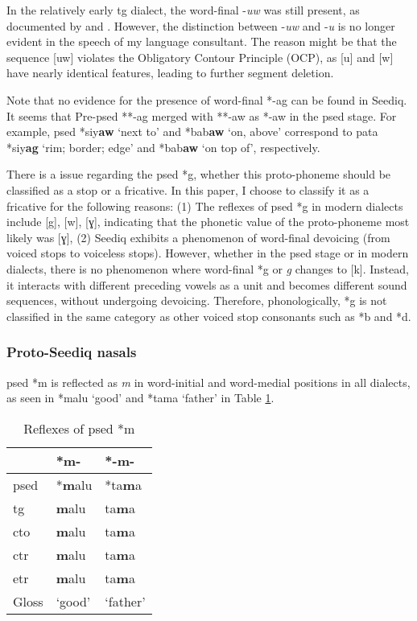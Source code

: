In the relatively early \acl{tg} dialect, the word-final -\textit{uw} was still present, as documented by \textcite{yang1976sedpho} and \textcite{li1981paic}. However, the distinction between -\textit{uw} and -\textit{u} is no longer evident in the speech of my language consultant. The reason might be that the sequence [uw] violates the Obligatory Contour Principle (OCP), as [u] and [w] have nearly identical features, leading to further segment deletion.

Note that no evidence for the presence of word-final *-ag can be found in Seediq. It seems that Pre-\acl{psed} **-ag merged with **-aw as *-aw in the \acl{psed} stage. For example, \acl{psed} *siy\textbf{aw} `next to' and *bab\textbf{aw} `on, above' correspond to \acl{pata} *siy\textbf{ag} `rim; border; edge' and *bab\textbf{aw} `on top of', respectively.

There is a issue regarding the \acl{psed} *g, whether this proto-phoneme should be classified as a stop or a fricative. In this paper, I choose to classify it as a fricative for the following reasons: (1) The reflexes of \acl{psed} *g in modern dialects include [g], [w], [ɣ], indicating that the phonetic value of the proto-phoneme most likely was [ɣ], (2) Seediq exhibits a phenomenon of word-final devoicing (from voiced stops to voiceless stops). However, whether in the \acl{psed} stage or in modern dialects, there is no phenomenon where word-final *g or \textit{g} changes to [k]. Instead, it interacts with different preceding vowels as a unit and becomes different sound sequences, without undergoing devoicing. Therefore, phonologically, *g is not classified in the same category as other voiced stop consonants such as *b and *d.

\subsubsection{Proto-Seediq nasals}

\acl{psed} *m is reflected as \textit{m} in word-initial and word-medial positions in all dialects, as seen in *malu `good' and *tama `father' in Table \ref{tab:psed_m}.

\begin{table}[!htbp]
\centering
\caption{Reflexes of \acl{psed} *m}
\label{tab:psed_m}
\begin{tabular}{lll}
\hline
           & *m-    & *-m-     \\ \hline
\acs{psed} & *\textbf{m}alu  & *ta\textbf{m}a    \\ \hdashline
\acs{tg}   & \textbf{m}alu   & ta\textbf{m}a     \\
\acs{cto}  & \textbf{m}alu   & ta\textbf{m}a     \\
\acs{ctr}  & \textbf{m}alu   & ta\textbf{m}a     \\
\acs{etr}  & \textbf{m}alu   & ta\textbf{m}a     \\ \hline
Gloss      & `good' & `father' \\ \hline
\end{tabular}
\end{table}

